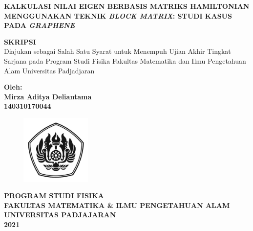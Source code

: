 \documentclass[12pt,a4paper]{report}
\begin{document}
	\begin{onehalfspacing}
\begin{titlepage}
	\centering
	{\textbf{KALKULASI NILAI EIGEN BERBASIS MATRIKS HAMILTONIAN MENGGUNAKAN TEKNIK \textit{BLOCK MATRIX}: STUDI KASUS PADA \textit{GRAPHENE}}}

	\vspace{2cm}

	\textbf{SKRIPSI} \\
	\vspace{0.5cm}
	Diajukan sebagai Salah Satu Syarat untuk Menempuh Ujian Akhir Tingkat Sarjana pada Program Studi Fisika Fakultas Matematika dan Ilmu Pengetahuan Alam Universitas Padjadjaran

	\vspace{1cm}
	\textbf{Oleh: \\
	Mirza Aditya Deliantama\\
	140310170044}

	\vspace{1cm}
	\begin{figure}[!htbp]
		\centering
		\includegraphics[width=3.5cm]{gambar/unpadbw.png}
		\label{cover}
	\end{figure}

	\vspace{3cm}
	{\textbf{PROGRAM STUDI FISIKA \\
	FAKULTAS MATEMATIKA \& ILMU PENGETAHUAN ALAM \\
	UNIVERSITAS PADJAJARAN \\
	2021 \\}}
\end{titlepage}

\setcounter{page}{2}




\end{onehalfspacing}
\end{document}
